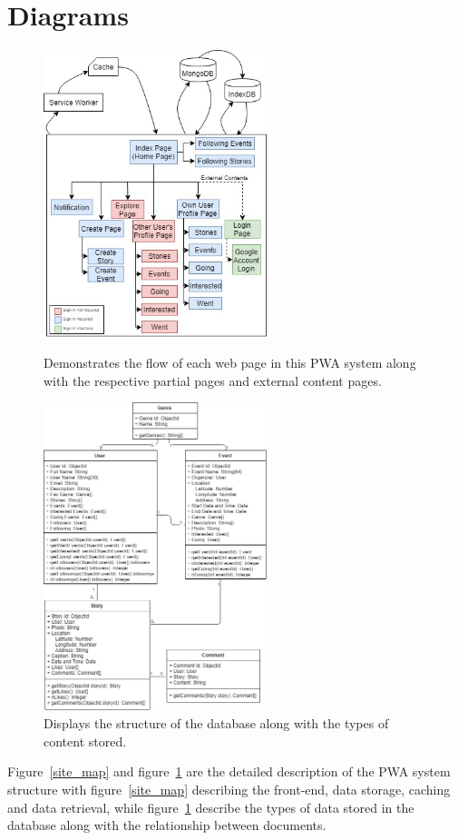 \documentclass[11pt, a4paper]{article}
\begin{document}
\section{Diagrams}
\begin{figure}[H]
  \begin{center}
    \begin{minipage}[b]{0.4\textwidth}
      \includegraphics[width=6.5cm]{site_map.jpg}
      \caption{Demonstrates the flow of each web page in this PWA system along with the respective
      partial pages and external content pages.}
      \label{site_map}
    \end{minipage}
    \qquad
    \begin{minipage}[b]{0.4\textwidth}
      \includegraphics[width=6.5cm]{uml.jpg}
      \caption{Displays the structure of the database along with the types of content stored.}
      \label{uml}
    \end{minipage}
  \end{center}
\end{figure}
Figure~\ref{site_map} and figure~\ref{uml} are the detailed description of the PWA system structure
with figure~\ref{site_map} describing the front-end, data storage, caching and data retrieval, while
figure~\ref{uml} describe the types of data stored in the database along with the relationship
between documents.
\end{document}
